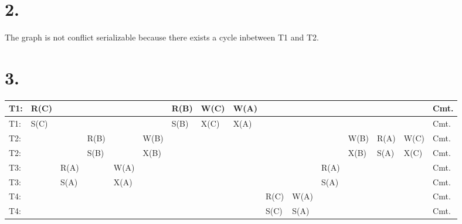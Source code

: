 \documentclass{article}
\begin{document}
\chapter{2.}

The graph is not conflict serializable because there exists a cycle inbetween T1 and T2.

\chapter{3.}

{\small %
\begin{tabular}{|l||lllllllllllllll|}
\hline
T1:&R(C)& & & & &R(B)&W(C) &W(A)& & & & &&&Cmt.\\ \hline
T1:&S(C)& & & & &S(B)&X(C) &X(A)& & & & &&&Cmt.\\ \hline
T2:&& &R(B)& &W(B)& & & & & & &W(B) &R(A)& W(C)&Cmt.\\ \hline
T2:&& &S(B)& &X(B)& & & & & & &X(B) &S(A)& X(C)&Cmt.\\ \hline
T3:&&R(A)& &W(A) & & & & && &R(A) & & &&Cmt.\\ \hline
T3:&&S(A)& &X(A) & & & & && &S(A) & & &&Cmt.\\ \hline
T4:&& & & & & & & & R(C)& W(A)&& & &&Cmt.\\ \hline
T4:&& & & & & & & & S(C)& S(A)&& & &&Cmt.\\ \hline
\end{tabular}
}
\end{document}
